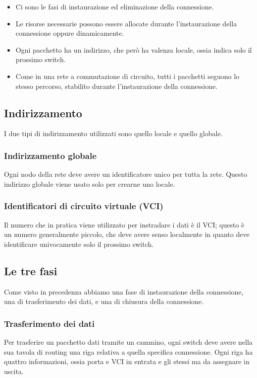     \begin{itemize}
        \item Ci sono le fasi di instaurazione ed eliminazione della connessione.
        
        \item Le risorse necessarie possono essere allocate durante l'instaurazione della connessione oppure dinamicamente.
        
        \item Ogni pacchetto ha un indirizzo, che però ha valenza locale, ossia indica solo il prossimo switch.
        
        \item Come in una rete a commutazione di circuito, tutti i pacchetti seguono lo stesso percorso, stabilito durante l'instaurazione della connessione.
    \end{itemize}
    
    \subsection{Indirizzamento}
        I due tipi di indirizzamento utilizzati sono quello locale e quello globale.
        
        \subsubsection{Indirizzamento globale}
            Ogni nodo della rete deve avere un identificatore unico per tutta la rete. Questo indirizzo globale viene usato solo per crearne uno locale.
            
        \subsubsection{Identificatori di circuito virtuale (VCI)}
            Il numero che in pratica viene utilizzato per instradare i dati è il VCI; questo è un numero generalmente piccolo, che deve avere senso localmente in quanto deve identificare univocamente solo il prossimo switch.
            
    \subsection{Le tre fasi}
        Come visto in precedenza abbiamo una fase di instaurazione della connessione, una di trasferimento dei dati, e una di chiusura della connessione.
        
        \subsubsection{Trasferimento dei dati}
            Per trasferire un pacchetto dati tramite un cammino, ogni switch deve avere nella sua tavola di routing una riga relativa a quella specifica connessione. Ogni riga ha quattro informazioni, ossia porta e VCI in entrata e gli stessi ma da assegnare in uscita. 
            
